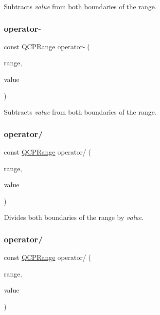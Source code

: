 Subtracts {\itshape value} from both boundaries of the range. \mbox{\label{class_q_c_p_range_a797f82830b516646da8873f82e39e356}} 
\subsubsection{\texorpdfstring{operator-\/}{operator-}\hspace{0.1cm}{\footnotesize\ttfamily [2/2]}}
{\footnotesize\ttfamily const \hyperlink{class_q_c_p_range}{Q\+C\+P\+Range} operator-\/ (\begin{DoxyParamCaption}\item[{const \hyperlink{class_q_c_p_range}{Q\+C\+P\+Range} \&}]{range,  }\item[{double}]{value }\end{DoxyParamCaption})\hspace{0.3cm}{\ttfamily [friend]}}

Subtracts {\itshape value} from both boundaries of the range. \mbox{\label{class_q_c_p_range_a4b366a3a21974c88e09b0d39d4a24a4b}} 
\subsubsection{\texorpdfstring{operator/}{operator/}\hspace{0.1cm}{\footnotesize\ttfamily [1/2]}}
{\footnotesize\ttfamily const \hyperlink{class_q_c_p_range}{Q\+C\+P\+Range} operator/ (\begin{DoxyParamCaption}\item[{const \hyperlink{class_q_c_p_range}{Q\+C\+P\+Range} \&}]{range,  }\item[{double}]{value }\end{DoxyParamCaption})\hspace{0.3cm}{\ttfamily [friend]}}

Divides both boundaries of the range by {\itshape value}. \mbox{\label{class_q_c_p_range_a4b366a3a21974c88e09b0d39d4a24a4b}} 
\subsubsection{\texorpdfstring{operator/}{operator/}\hspace{0.1cm}{\footnotesize\ttfamily [2/2]}}
{\footnotesize\ttfamily const \hyperlink{class_q_c_p_range}{Q\+C\+P\+Range} operator/ (\begin{DoxyParamCaption}\item[{const \hyperlink{class_q_c_p_range}{Q\+C\+P\+Range} \&}]{range,  }\item[{double}]{value }\end{DoxyParamCaption})\hspace{0.3cm}{\ttfamily [friend]}}

